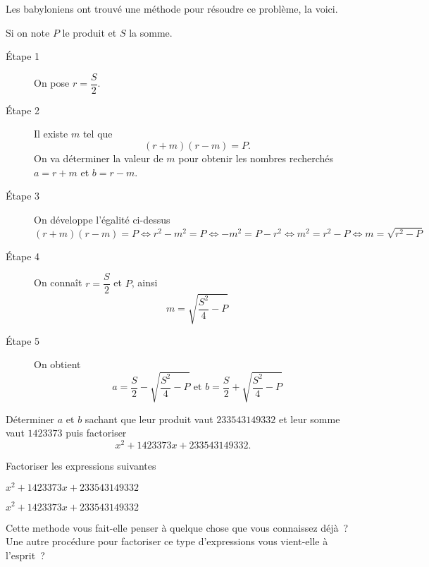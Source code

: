 \documentclass[a4paper,12pt]{report}
\begin{document}
	\vspace{15pt}
	\myrulefill
	\vspace{15pt}

	\myrulefill
	\vspace{15pt}

\afterpage{\bpage}
\newpage


Les babyloniens ont trouvé une méthode pour résoudre ce problème, la voici.

Si on note $P$ le produit et $S$ la somme.
\begin{description}
	\item[Étape 1] On pose $r=\dfrac{S}{2}$.
	\item[Étape 2] Il existe $m$ tel que \[(r+m)(r-m)=P.\] On va déterminer la valeur de $m$ pour obtenir les nombres recherchés $a=r+m$ et $b=r-m$. 
	\item[Étape 3] On développe l'égalité ci-dessus
		\[(r+m)(r-m)=P \iff r^2-m^2=P \iff -m^2=P-r^2\iff m^2=r^2-P \iff m=\sqrt{r^2-P}\]
	\item[Étape 4] On connaît $r=\dfrac{S}{2}$ et $P$, ainsi
		\[m=\sqrt{\dfrac{S^2}{4}-P}\]
	\item[Étape 5] On obtient 
		\[a=\dfrac{S}{2}-\sqrt{\dfrac{S^2}{4}-P} \text{ et } b=\dfrac{S}{2}+\sqrt{\dfrac{S^2}{4}-P}\]
\end{description}
Déterminer $a$ et $b$ sachant que leur produit vaut $233543149332$ et leur somme vaut $1423373$ puis factoriser \[x^2+1423373x+233543149332.\]
\framebox[\textwidth]{\rule{0pt}{170pt}}

\begin{exo}
	Factoriser les expressions suivantes
	\begin{tasks}
		\task $x^2+1423373x+233543149332$

\framebox[0.9\textwidth]{\rule{0pt}{170pt}}
		\task $x^2+1423373x+233543149332$

\framebox[0.9\textwidth]{\rule{0pt}{170pt}}
	\end{tasks}
\end{exo}
Cette methode vous fait-elle penser à quelque chose que vous connaissez déjà~? Une autre procédure pour factoriser ce type d'expressions vous vient-elle à l'esprit~? 


	\vspace{15pt}
	\myrulefill
	\vspace{15pt}

	\myrulefill

	\vspace{15pt}
	\myrulefill
	\vspace{15pt}

	\myrulefill
	\vspace{15pt}

	\newpage

\end{document}
